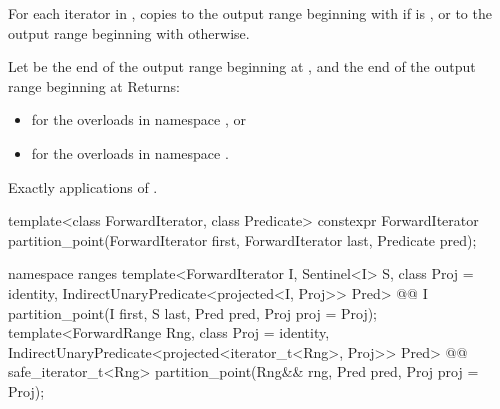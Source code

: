 \begin{itemdescr}
\pnum
\effects For each iterator  in , copies 
to the output range beginning with  if
  is , or
to the output range beginning with  otherwise.

\pnum
\returns
{}
\begin{newnewblock}
Let  be the end of the output range beginning at ,
and  the end of the output range beginning at 
Returns:
\begin{itemize}
\item {} for the overloads in namespace , or
\item {} for the overloads in namespace .
\end{itemize}
\end{newnewblock}

\pnum
\complexity Exactly  applications of 
.
\end{itemdescr}

%
\begin{itemdecl}
template<class ForwardIterator, class Predicate>
  constexpr ForwardIterator
    partition_point(ForwardIterator first, ForwardIterator last, Predicate pred);
\end{itemdecl}
\begin{addedblock}
\begin{itemdecl}
namespace ranges {
  template<ForwardIterator I, Sentinel<I> S, class Proj = identity,
      IndirectUnaryPredicate<projected<I, Proj>> Pred>
    @@ I partition_point(I first, S last, Pred pred, Proj proj = Proj{});
  template<ForwardRange Rng, class Proj = identity,
      IndirectUnaryPredicate<projected<iterator_t<Rng>, Proj>> Pred>
    @@ safe_iterator_t<Rng>
      partition_point(Rng&& rng, Pred pred, Proj proj = Proj{});
}
\end{itemdecl}
\end{addedblock}

